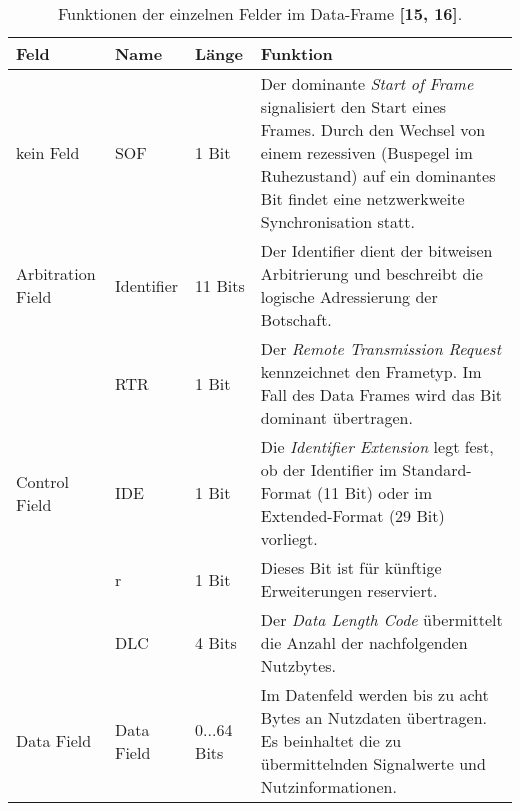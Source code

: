\begin{table}[!htbp]
	\centering
	\caption{Funktionen der einzelnen Felder im Data-Frame \textbf{[15, 16]}.}
	\footnotesize
	\renewcommand{\arraystretch}{1.3}
	\begin{tabular}{l | l l p{7.5cm}}
		\toprule
		Feld              & Name       & Länge       & Funktion                                                                                                                                                                                                          \\ \midrule
		kein Feld         & SOF        & 1 Bit       & Der dominante \emph{Start of Frame} signalisiert den Start eines Frames. Durch den Wechsel von einem rezessiven (Buspegel im Ruhezustand) auf ein dominantes Bit findet eine netzwerkweite Synchronisation statt. \\
		\midrule
		Arbitration Field & Identifier & 11 Bits     & Der Identifier dient der bitweisen Arbitrierung und beschreibt die logische Adressierung der Botschaft.                                                                                                           \\
		                  & RTR        & 1 Bit       & Der \emph{Remote Transmission Request} kennzeichnet	den Frametyp. Im Fall des Data Frames wird das Bit dominant übertragen.                                                                                       \\
		\midrule
		Control Field & IDE        & 1 Bit       & Die \emph{Identifier Extension} legt fest, ob der Identifier im Standard-Format (11 Bit) oder im Extended-Format (29 Bit) vorliegt.                                                                               \\
		                  & r          & 1 Bit       & Dieses Bit ist für künftige Erweiterungen reserviert.                                                                                                                                                             \\
		                  & DLC        & 4 Bits      & Der \emph{Data Length Code} übermittelt die Anzahl der nachfolgenden Nutzbytes.                                                                                                                                   \\
		\midrule
		Data Field        & Data Field & 0...64 Bits & Im Datenfeld werden bis zu acht Bytes an Nutzdaten übertragen. Es beinhaltet die zu übermittelnden Signalwerte und Nutzinformationen.                                                                             \\

\end{tabular}
\end{table}
